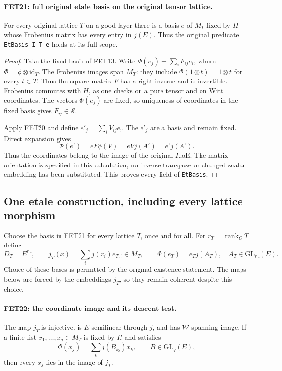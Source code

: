 \paragraph{FET21: full original etale basis on the original tensor lattice.}
\label{claim:FET21}
For every original lattice $T$ on a good layer there is a basis
$e$ of $M_T$ fixed by $H$ whose Frobenius matrix has every
entry in $j(E)$. Thus the original predicate \texttt{EtBasis I T e}
holds at its full scope.

\begin{proof}
Take the fixed basis of FET13. Write
$\Phi(e_j)=\sum_i F_{ij}e_i$, where
$\Phi=\phi\otimes\mathrm{id}_T$.
The Frobenius images span $M_T$: they include
$\Phi(1\otimes t)=1\otimes t$ for every $t\in T$.
Thus the square matrix $F$ has a right inverse and is invertible.
Frobenius commutes with $H$, as one checks on a pure tensor
and on Witt coordinates. The vectors $\Phi(e_j)$ are fixed,
so uniqueness of coordinates in the fixed basis gives
$F_{ij}\in\mathcal S$.

Apply FET20 and define $e'_j=\sum_i V_{ij}e_i$.
The $e'_j$ are a basis and remain fixed. Direct expansion gives
\[
 \Phi(e')=eF\phi(V)=eVj(A')=e'j(A').
\]
Thus the coordinates belong to the image of the original
$I.\mathrm{ioE}$. The matrix orientation is specified in this
calculation; no inverse transpose or changed scalar embedding
has been substituted. This proves every field of \texttt{EtBasis}.
\end{proof}

\subsection{One etale construction, including every lattice morphism}

Choose the basis in FET21 for every lattice $T$, once and for all.
For $r_T=\operatorname{rank}_O T$ define
\[
 D_T=E^{r_T},\qquad
 j_T(x)=\sum_i j(x_i)e_{T,i}\in M_T,
 \qquad \Phi(e_T)=e_Tj(A_T),\quad A_T\in\mathrm{GL}_{r_T}(E).
                                                               \tag{FET.20}
\]
Choice of these bases is permitted by the original existence
statement. The maps below are forced by the embeddings $j_T$, so
they remain coherent despite this choice.

\paragraph{FET22: the coordinate image and its descent test.}
\label{claim:FET22}
The map $j_T$ is injective, is $E$-semilinear through $j$, and
has $\mathcal W$-spanning image. If a finite list
$x_1,\ldots,x_q\in M_T$ is fixed by $H$ and satisfies
\[
       \Phi(x_j)=\sum_k j(B_{kj})x_k,\qquad B\in\mathrm{GL}_q(E),
                                                               \tag{FET.21}
\]
then every $x_j$ lies in the image of $j_T$.

